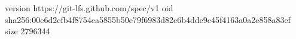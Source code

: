 version https://git-lfs.github.com/spec/v1
oid sha256:00e6d2cfb4f8754ea5855b50e79f6983d82e6b4dde9c45f4163a0a2e858a83ef
size 2796344

